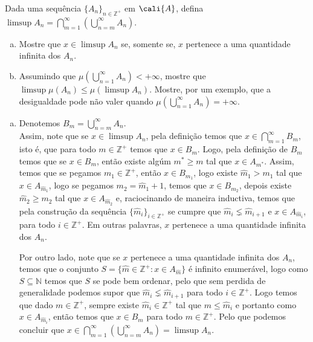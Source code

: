 \begin{homeworkProblem}[6]
  Dada uma sequência $\{A_n\}_{n\in\mathbb{Z}^{+}}$ em $\cali{A}$, defina $\limsup A_n=\bigcap_{m=1}^{\infty}\left( \bigcup_{n=m}^{\infty} A_n \right)$.
  \begin{enumerate}[a)]
    \item Mostre que $x\in \limsup A_n$ se, somente se, $x$ pertenece a uma quantidade infinita dos $A_n$.
    \item Assumindo que $\mu\left( \bigcup_{n=1}^{\infty}A_n \right)<+\infty$, mostre que $\limsup\mu(A_n)\leq \mu\left( \limsup A_n \right)$. Mostre, por um exemplo, que a desigualdade pode não valer quando $\mu\left( \bigcup_{n=1}^{\infty}A_n \right)=+\infty$.
  \end{enumerate}
  \begin{solution}
    \begin{enumerate}[a)]
      \item Denotemos $B_m=\bigcup_{n=m}^{\infty}A_n$.\\ 
        Assim, note que se $x\in\limsup A_n$, pela definição temos que $x\in\bigcap_{m=1}^{\infty}B_m$, isto é, que para todo $m\in\mathbb{Z}^{+}$ temos que $x\in B_m$. Logo, pela definição de $B_m$ temos que se $x\in B_m$, então existe algúm $m^{\ast}\geq m$ tal que $x\in A_{m^{\ast}}$. Assim, temos que se pegamos $m_1\in\mathbb{Z}^{+}$, então $x\in B_{m_1}$, logo existe $\hat{m}_1>m_1$ tal que $x\in A_{\hat{m}_1}$, logo se pegamos $m_2=\hat{m}_1+1$, temos que $x\in B_{m_2}$, depois existe $\hat{m}_2\geq m_2$ tal que $x\in A_{\hat{m}_2}$ e, raciocinando de maneira inductiva, temos que pela construção da sequência $\{\hat{m}_i\}_{i\in\mathbb{Z}^{+}}$ se cumpre que $\hat{m}_{i}\lneq \hat{m}_{i+1}$ e $x\in A_{\hat{m}_i}$, para todo $i\in\mathbb{Z}^{+}$. Em  outras palavras, $x$ pertenece a uma quantidade infinita dos $A_n$. 

        Por outro lado, note que se $x$ pertenece a uma quantidade infinita dos $A_n$, temos que o conjunto $S=\{\hat{m}\in\mathbb{Z}^{+}:x\in A_{\hat{m}}\}$ é infinito enumerável, logo como $S\subseteq \mathbb{N}$ temos que $S$ se pode bem ordenar, pelo que sem perdida de generalidade podemos supor que $\hat{m}_{i}\lneq \hat{m}_{i+1}$ para todo $i\in\mathbb{Z}^{+}$. Logo temos que dado $m\in\mathbb{Z}^{+}$, sempre existe $\hat{m}_{i}\in\mathbb{Z}^{+}$ tal que $m\leq \hat{m}_{i}$ e portanto como $x\in A_{\hat{m}_i}$, então temos que $x\in B_m$ para todo $m\in\mathbb{Z}^{+}$. Pelo que podemos concluir que $x\in\bigcap_{m=1}^{\infty}\left( \bigcup_{n=m}^{\infty}A_n \right)=\limsup A_n$.


\end{enumerate}
\end{solution}
\end{homeworkProblem}
